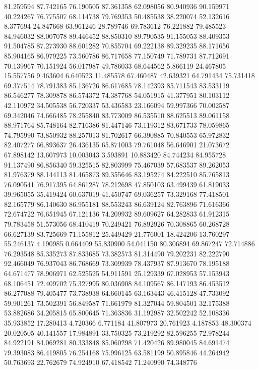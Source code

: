81.259594
87.742165
76.190505
87.361358
62.098056
80.940936
90.159971
40.224267
76.775507
68.114738
79.769353
50.485538
38.220074
52.132616
8.377694
24.847668
63.961246
28.789746
69.783612
76.221882
79.485523
84.946032
88.007078
89.446452
88.850310
89.790535
91.155053
88.409353
91.504785
87.273930
88.601282
70.855704
69.222138
89.329235
88.171656
85.904165
86.979225
73.560786
86.717658
77.150749
71.789731
87.712691
70.139967
70.151924
56.017987
49.786033
68.644562
5.866119
24.467805
15.557756
9.463604
6.640523
11.485578
67.460487
42.639321
64.791434
75.731418
69.377514
78.791383
85.136726
86.617685
78.142393
85.711543
83.533119
86.546277
78.309878
86.574372
74.387768
54.051915
41.377951
80.103112
42.110972
34.505538
56.720337
53.436583
23.166094
59.997366
70.002587
69.342046
74.666485
78.255840
83.773009
86.535510
88.625513
89.061158
88.971764
85.748164
82.716386
81.447146
73.119312
83.671733
78.059865
74.795990
73.850932
88.257013
81.702617
66.390885
70.840553
65.972832
82.407277
66.893637
26.436135
65.871003
79.761048
56.646901
21.073672
67.898142
13.607973
10.003043
3.593891
10.883420
84.744234
84.955728
91.137490
86.856340
59.325515
82.803999
75.467039
57.683537
89.262053
81.976379
88.144113
81.465873
89.355646
83.195274
84.222510
85.765813
76.090541
76.917395
64.861287
78.212698
47.850103
63.499439
61.819033
39.965055
35.419424
60.637019
41.450747
69.036257
73.329168
77.418501
82.165779
86.140630
86.955181
88.553243
86.639124
82.763896
71.616366
72.674722
76.651945
67.121136
74.209932
89.609627
64.282833
61.912315
79.783458
51.573056
68.410419
70.249421
76.892926
70.308865
60.268728
66.627139
83.725669
71.155812
25.449429
21.776001
18.424206
13.760297
55.246137
4.190985
0.664409
55.830900
54.041150
80.306894
69.867247
72.714886
76.293548
85.335273
87.833685
73.382573
81.314490
79.202231
82.222790
92.466049
76.937043
86.768669
73.309939
78.437937
87.913670
78.195188
64.671477
78.906971
62.525525
54.911591
25.129339
67.028953
57.153943
68.106451
72.409702
75.327995
80.036908
84.109567
86.147193
86.453512
86.277088
79.405477
73.738938
64.660145
63.163443
46.415128
47.733092
59.901261
73.502391
56.849587
71.661979
81.327044
59.804501
32.175388
53.882686
34.205815
65.800645
71.363836
31.192987
32.502242
52.108336
35.933852
17.280413
4.720366
6.771184
41.807973
20.761923
4.187853
48.300374
20.020505
40.141557
17.984891
33.750325
73.219292
82.596255
72.978244
84.922191
84.069281
80.333848
85.060298
71.420426
89.980045
84.691474
79.393083
86.419805
76.254168
75.996125
63.581199
50.895846
44.264942
50.763693
22.762679
74.924910
67.418542
71.240990
74.348776
